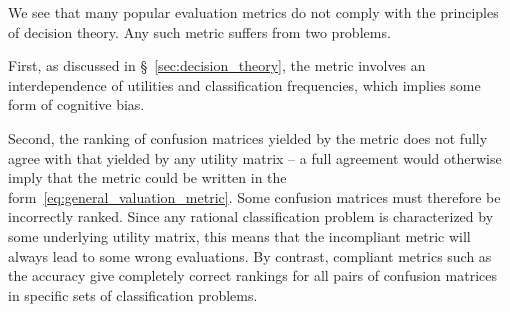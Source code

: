 \documentclass[\ifafour a4paper,12pt,\else a5paper,10pt,\fi%
onecolumn,oneside,article,%
british%
]{memoir}
\theoremstyle{remark}
\theoremstyle{innote}
\renewcommand*{\|}[1][]{\nonscript\:#1\vert\nonscript\:\mathopen{}}
\newcommand*{\sect}{\S}%
\begin{document}
We see that many popular evaluation metrics do not comply with the principles of decision theory. Any such metric suffers from two problems.

First, as discussed in \sect~\ref{sec:decision_theory}, the metric involves an interdependence of utilities and classification frequencies, which implies some form of cognitive bias\autocites[discuss such biases regarding the $F_{1}$-measure]{handetal2018}.

Second, the ranking of confusion matrices yielded by the metric does not fully agree with that yielded by any utility matrix -- a full agreement would otherwise imply that the metric could be written in the form~\eqref{eq:general_valuation_metric}. Some confusion matrices must therefore be incorrectly ranked. Since any rational classification problem is characterized by some underlying utility matrix, this means that the incompliant metric will always lead to some wrong evaluations. By contrast, compliant metrics such as the accuracy give completely correct rankings for all pairs of confusion matrices in specific sets of classification problems.
\end{document}
